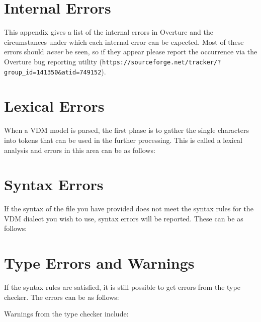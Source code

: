\documentclass{overturerepchap}
\newcommand{\url}[1]{\texttt{#1}}
\begin{document}
\newpage
\chapter{Internal Errors}\label{app:internalerrors}

This appendix gives a list of the internal errors in Overture
and the circumstances under which each internal error can be expected.
Most of these errors should \emph{never} be seen, so if they appear
please report the occurrence via the Overture bug reporting utility
(\url{https://sourceforge.net/tracker/?group_id=141350&atid=749152}). 



\newpage
\chapter{Lexical Errors}\label{app:lexerr}

When a VDM model is parsed, the first phase is to gather the single
characters into tokens that can be used in the further
processing. This is called a lexical analysis and errors in this area
can be as follows:



\newpage
\chapter{Syntax Errors}\label{app:synerr}

If the syntax of the file you have provided does not meet the
syntax rules for the VDM dialect you wish to use, syntax errors will be
reported. These can be as follows:



\newpage
\chapter{Type Errors and Warnings}\label{app:typeerr}

If the syntax rules are satisfied, it is still possible to get
errors from the type checker. The errors can be as
follows:



Warnings from the type checker include:


\end{document}
